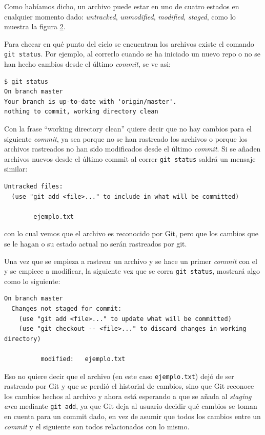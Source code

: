 \documentclass[spanish, 12pt, a4paper]{article}
\begin{document}
Como habíamos dicho, un archivo puede estar en uno de cuatro estados en
cualquier momento dado: \emph{untracked}, \emph{unmodified},
\emph{modified}, \emph{staged}, como lo muestra la figura
\protect\hyperlink{fig:lifecycle}{2}.

Para checar en qué punto del ciclo se encuentran los archivos existe el
comando \passthrough{\lstinline!git status!}. Por ejemplo, al correrlo
cuando se ha iniciado un nuevo repo o no se han hecho cambios desde el
último \emph{commit}, se ve asi:

\begin{lstlisting}
$ git status
On branch master
Your branch is up-to-date with 'origin/master'.
nothing to commit, working directory clean
\end{lstlisting}

Con la frase ``working directory clean'' quiere decir que no hay cambios
para el siguiente \emph{commit}, ya sea porque no se han rastreado los
archivos o porque los archivos rastreados no han sido modificados desde
el último \emph{commit}. Si se añaden archivos nuevos desde el último
commit al correr \passthrough{\lstinline!git status!} saldrá un mensaje
similar:

\begin{lstlisting}
Untracked files:
  (use "git add <file>..." to include in what will be committed)

        ejemplo.txt
\end{lstlisting}

con lo cual vemos que el archivo es reconocido por Git, pero que los
cambios que se le hagan o su estado actual no serán rastreados por git.

Una vez que se empieza a rastrear un archivo y se hace un primer
\emph{commit} con el y se empiece a modificar, la siguiente vez que se
corra \passthrough{\lstinline!git status!}, mostrará algo como lo
siguiente:

\begin{lstlisting}
On branch master
  Changes not staged for commit:
    (use "git add <file>..." to update what will be committed)
    (use "git checkout -- <file>..." to discard changes in working directory)

          modified:   ejemplo.txt
\end{lstlisting}

Eso no quiere decir que el archivo (en este caso
\passthrough{\lstinline!ejemplo.txt!}) dejó de ser rastreado por Git y
que se perdió el historial de cambios, sino que Git reconoce los cambios
hechos al archivo y ahora está esperando a que se añada al \emph{staging
area} mediante \passthrough{\lstinline!git add!}, ya que Git deja al
usuario decidir qué cambios se toman en cuenta para un commit dado, en
vez de asumir que todos los cambios entre un \emph{commit} y el
siguiente son todos relacionados con lo mismo.
\end{document}
